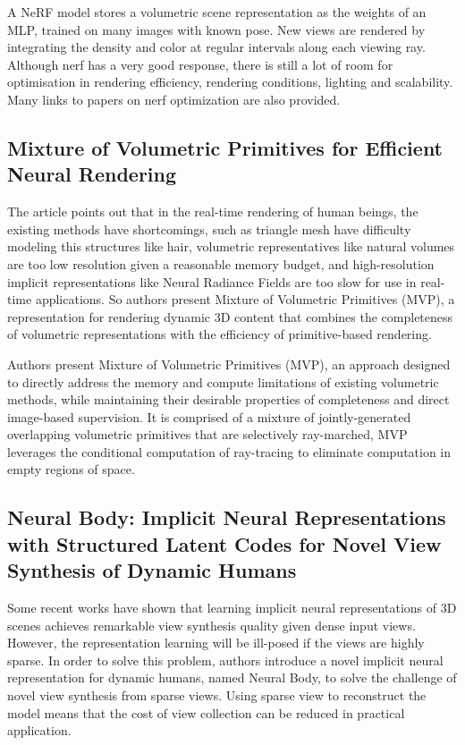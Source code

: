 \documentclass[UTF-8]{ctexart}
\begin{document}
A NeRF model stores a volumetric scene representation as the weights of an MLP, trained on many images with known pose. New views are rendered by integrating the density and color at regular intervals along each viewing ray. Although nerf has a very good response, there is still a lot of room for optimisation in rendering efficiency, rendering conditions, lighting and scalability. Many links to papers on nerf optimization are also provided.

\subsection{Mixture of Volumetric Primitives for Efficient Neural Rendering}
The article points out that in the real-time rendering of human beings, the existing methods have shortcomings, such as triangle mesh have difficulty modeling this structures like hair, volumetric representatives like natural volumes are too low resolution given a reasonable memory budget, and high-resolution implicit representations like Neural Radiance Fields are too slow for use in real-time applications. So authors present Mixture of Volumetric Primitives (MVP), a representation for rendering dynamic 3D content that combines the completeness of volumetric representations with the efficiency of primitive-based rendering. 

Authors present Mixture of Volumetric Primitives (MVP), an approach designed to directly address the memory and compute limitations of existing volumetric methods, while maintaining their desirable properties of completeness and direct image-based supervision. It is comprised of a mixture of jointly-generated overlapping volumetric primitives that are selectively ray-marched, MVP leverages the conditional computation of ray-tracing to eliminate computation in empty regions of space.

\subsection{Neural Body: Implicit Neural Representations with Structured Latent Codes for Novel View Synthesis of Dynamic Humans}
Some recent works have shown that learning implicit neural representations of 3D scenes achieves remarkable view synthesis quality given dense input views. However, the representation learning will be ill-posed if the views are highly sparse. In order to solve this problem, authors introduce a novel implicit neural representation for dynamic humans, named Neural Body, to solve the challenge of novel view synthesis from sparse views. Using sparse view to reconstruct the model means that the cost of view collection can be reduced in practical application.
\end{document}
